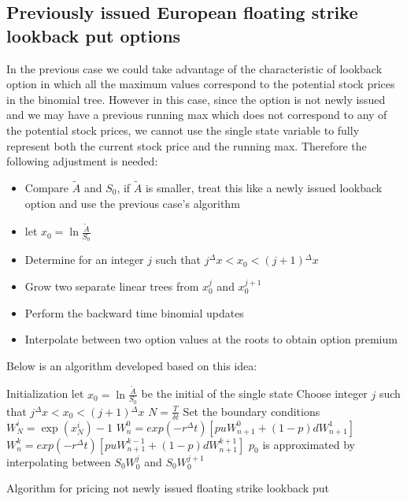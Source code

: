 \subsection{Previously issued European floating strike lookback put options}
In the previous case we could take advantage of the characteristic of lookback option in which all the maximum values correspond to the potential stock prices in the binomial tree. However in this case, since the option is not newly issued and we may have a previous running max which does not correspond to any of the potential stock prices, we cannot use the single state variable to fully represent both the current stock price and the running max. Therefore the following adjustment is needed:
\begin{itemize}
	\item Compare $\tilde{A}$ and $S_{0}$, if $\tilde{A}$ is smaller, treat this like a newly issued lookback option and use the previous case's algorithm
	\item let $x_{0} = \ln \frac{\tilde{A}}{S_{0}}$
	\item Determine for an integer $j$ such that $j{^{\Delta}x} < x_{0} < (j+1){^{\Delta}x}$
	\item Grow two separate linear trees from $x_{0}^{j}$ and $x_{0}^{j+1}$
	\item Perform the backward time binomial updates
	\item Interpolate between two option values at the roots to obtain option premium
\end{itemize}
Below is an algorithm developed based on this idea:

\begin{algorithm}[H]
 Initialization\;
 let $x_{0} = \ln \frac{\tilde{A}}{S_{0}}$ be the initial  of the single state\;
 Choose integer $j$ such that $j{^{\Delta}x} < x_{0} < (j+1){^{\Delta}x}$\;
 $N = \frac{T}{\delta t}$\;
 Set the boundary conditions\;
  {
  $W_{N}^{i} = \exp(x_{N}^{i}) - 1$\;
 }
  {
   {
    $W_{n}^{0} = exp(-r{^{\Delta}t})[puW_{n+1}^{0}+(1-p)dW_{n+1}^{1}]$\;
  }
   {
    $W_{n}^{k} = exp(-r{^{\Delta}t})[puW_{n+1}^{k-1}+(1-p)dW_{n+1}^{k+1}]$\;
  }
 }
 $p_{0}$ is approximated by interpolating between $S_{0}W_{0}^{j}$ and $S_{0}W_{0}^{j+1}$\;
\caption{Algorithm for pricing not newly issued floating strike lookback put}
\end{algorithm}
\newpage

